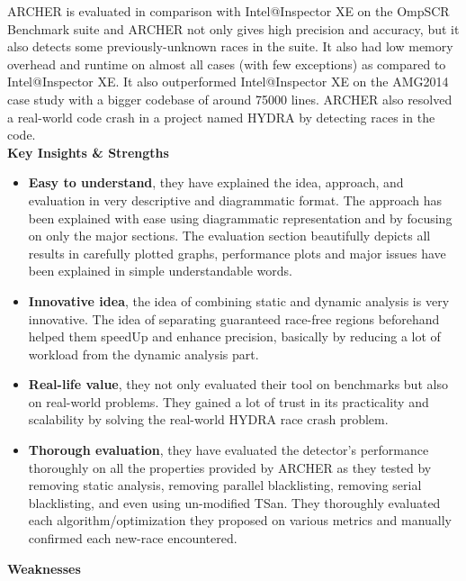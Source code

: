 \documentclass[a4paper]{article}
\begin{document}
ARCHER is evaluated in comparison with Intel@Inspector XE on the OmpSCR Benchmark suite and ARCHER not only gives high precision and accuracy, but it also detects some previously-unknown races in the suite. It also had low memory overhead and runtime on almost all cases (with few exceptions) as compared to Intel@Inspector XE. It also outperformed Intel@Inspector XE on the AMG2014 case study with a bigger codebase of around 75000 lines. ARCHER also resolved a real-world code crash in a project named HYDRA by detecting races in the code. \\ 
\newline
\newline
{\bf\Large Key Insights \& Strengths} \\
\begin{itemize}
\item {\bf Easy to understand}, they have explained the idea, approach, and evaluation in very descriptive and diagrammatic format. The approach has been explained with ease using diagrammatic representation and by focusing on only the major sections. The evaluation section beautifully depicts all results in carefully plotted graphs, performance plots and major issues have been explained in simple understandable words. 
\item {\bf Innovative idea}, the idea of combining static and dynamic analysis is very innovative. The idea of separating guaranteed race-free regions beforehand helped them speedUp and enhance precision, basically by reducing a lot of workload from the dynamic analysis part.
\item {\bf Real-life value}, they not only evaluated their tool on benchmarks but also on real-world problems. They gained a lot of trust in its practicality and scalability by solving the real-world HYDRA race crash problem.
\item {\bf Thorough evaluation}, they have evaluated the detector's performance thoroughly on all the properties provided by ARCHER as they tested by removing static analysis, removing parallel blacklisting, removing serial blacklisting, and even using un-modified TSan. They thoroughly evaluated each algorithm/optimization they proposed on various metrics and manually confirmed each new-race encountered.
\end{itemize}
\vspace{1.0cm}
{\bf\Large Weaknesses} \\
\end{document}
